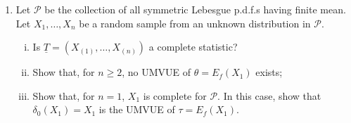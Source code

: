 \documentclass[12pt]{article}
\begin{document}
\begin{enumerate}
    \item Let $\mathcal{P}$ be the collection of all symmetric Lebesgue p.d.f.s having finite mean. Let $X_{1}, \dots, X_{n}$ be a random sample from an unknown distribution in $\mathcal{P}$.
    \begin{enumerate}[(i)]
        \item Is $\underline{T} = (X_{(1)}, \dots, X_{(n)})$ a complete statistic?
        \item Show that, for $n \ge 2$, no UMVUE of $\theta = E_{f}(X_{1})$ exists;
        \item Show that, for $n = 1$, $X_{1}$ is complete for $\mathcal{P}$. In this case, show that $\delta_{0}(X_{1}) = X_{1}$ is the UMVUE of $\tau = E_{f}(X_{1})$.
    \end{enumerate}
\end{enumerate}
\end{document}
